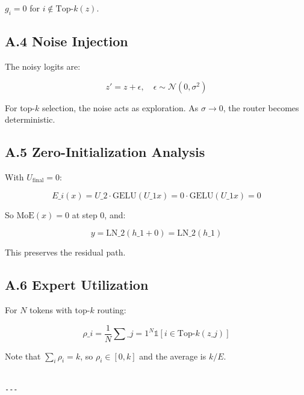 $g_i = 0$ for $i \notin \text{Top-}k(z)$.

\subsection{A.4 Noise Injection}

The noisy logits are:

\[
z' = z + \epsilon, \quad \epsilon \sim \mathcal{N}(0, \sigma^2)
\]

For top-$k$ selection, the noise acts as exploration. As $\sigma \to 0$, 
the router becomes deterministic.

\subsection{A.5 Zero-Initialization Analysis}

With $U_\text{final} = 0$:

\[
E\_i(x) = U\_2 \cdot \text{GELU}(U\_1 x) = 0 \cdot \text{GELU}(U\_1 x) = 0
\]

So $\text{MoE}(x) = 0$ at step 0, and:

\[
y = \text{LN}\_2(h\_1 + 0) = \text{LN}\_2(h\_1)
\]

This preserves the residual path.

\subsection{A.6 Expert Utilization}

For $N$ tokens with top-$k$ routing:

\[
\rho\_i = \frac{1}{N} \sum\_{j=1}^{N} \mathbb{1}[i \in \text{Top-}k(z\_j)]
\]

Note that $\sum_i \rho_i = k$, so $\rho_i \in [0, k]$ and the average is 
$k / E$.
\begin{lstlisting}

---
\end{lstlisting}